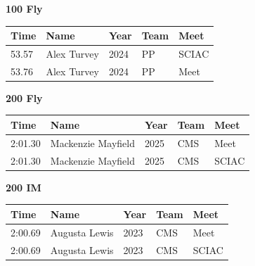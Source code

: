 \vspace{1.2em}
\noindent\begin{minipage}[t]{0.98\textwidth}
\centering
\textbf{\textcolor{teamprimary}{100 Fly}}\par
\vspace{0.5em}
\centering
\small
\renewcommand{\arraystretch}{1.0}
\setlength{\tabcolsep}{4pt}
\begin{tabular}{@{}p{2.5cm}p{4.5cm}p{1.5cm}p{2.5cm}p{2.5cm}@{}}
\toprule
\textbf{Time} & \textbf{Name} & \textbf{Year} & \textbf{Team} & \textbf{Meet} \\
\midrule
53.57 & Alex Turvey & 2024 & PP & SCIAC \\
53.76 & Alex Turvey & 2024 & PP & Meet \\
\bottomrule
\end{tabular}
\end{minipage}
\vspace{1.2em}
\noindent\begin{minipage}[t]{0.98\textwidth}
\centering
\textbf{\textcolor{teamprimary}{200 Fly}}\par
\vspace{0.5em}
\centering
\small
\renewcommand{\arraystretch}{1.0}
\setlength{\tabcolsep}{4pt}
\begin{tabular}{@{}p{2.5cm}p{4.5cm}p{1.5cm}p{2.5cm}p{2.5cm}@{}}
\toprule
\textbf{Time} & \textbf{Name} & \textbf{Year} & \textbf{Team} & \textbf{Meet} \\
\midrule
2:01.30 & Mackenzie Mayfield & 2025 & CMS & Meet \\
2:01.30 & Mackenzie Mayfield & 2025 & CMS & SCIAC \\
\bottomrule
\end{tabular}
\end{minipage}
\vspace{1.2em}
\noindent\begin{minipage}[t]{0.98\textwidth}
\centering
\textbf{\textcolor{teamprimary}{200 IM}}\par
\vspace{0.5em}
\centering
\small
\renewcommand{\arraystretch}{1.0}
\setlength{\tabcolsep}{4pt}
\begin{tabular}{@{}p{2.5cm}p{4.5cm}p{1.5cm}p{2.5cm}p{2.5cm}@{}}
\toprule
\textbf{Time} & \textbf{Name} & \textbf{Year} & \textbf{Team} & \textbf{Meet} \\
\midrule
2:00.69 & Augusta Lewis & 2023 & CMS & Meet \\
2:00.69 & Augusta Lewis & 2023 & CMS & SCIAC \\
\bottomrule
\end{tabular}
\end{minipage}
